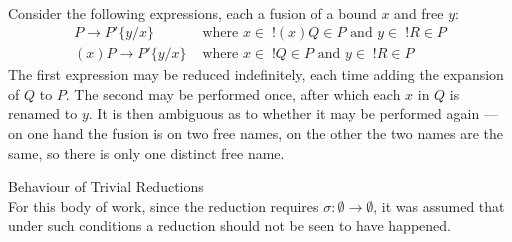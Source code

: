         \begin{example*}{~\\}
            Consider the following expressions, each a fusion of a bound $x$ and free $y$:
            \begin{align*}
                P \rightarrow P'\{y / x\} & \text{ where } x \in \; !(x)Q \in P \text{ and } y \in \; !R \in P \\
                (x)P \rightarrow P'\{y / x\} & \text{ where } x \in \; !Q \in P \text{ and } y \in \; !R \in P
            \end{align*}
            The first expression may be reduced indefinitely, each time adding the expansion of $Q$ to $P$.
            The second may be performed once, after which each $x$ in $Q$ is renamed to $y$.
            It is then ambiguous as to whether it may be performed again --- on one hand the fusion is on two free names, on the other the two names are the same, so there is only one distinct free name.
        \end{example*}

        \begin{remark*}{Behaviour of Trivial Reductions\\}
            For this body of work, since the reduction requires $\sigma : \emptyset \rightarrow \emptyset$, it was assumed that under such conditions a reduction should not be seen to have happened.
        \end{remark*}
